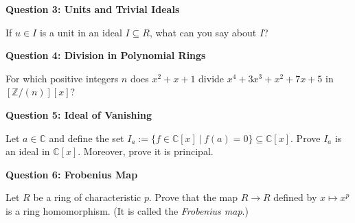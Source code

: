 \documentclass[11pt,twoside, a4paper]{report}
\theoremstyle{plain}
\theoremstyle{definition}
\begin{document}

  


  
\begin{center}
{\bf Question 3: Units and Trivial Ideals}
\end{center}

If $u\in I$ is a unit in an ideal $I\subseteq R$, what can you say about $I$?

  


\begin{center}
{\bf Question 4: Division in Polynomial Rings }
\end{center}
For which positive integers $n$ does $x^2 + x + 1$ divide $x^4 + 3x^3 +x^2 + 7x +5$ in $[\mathbb{Z}/(n)][x]$?

  


  
\begin{center}
{\bf Question 5: Ideal of Vanishing}
\end{center}

Let $a \in \mathbb{C}$ and define the set $I_{a}:= \{ f \in \mathbb{C}[x] \ | \ f(a) = 0 \} \subseteq \mathbb{C}[x]$. Prove $I_{a}$ is an ideal in $\mathbb{C}[x]$. Moreover, prove it is principal. 

\begin{center}
{\bf Question 6: Frobenius Map}
\end{center}

Let $R$ be a ring of characteristic $p$. Prove that the map $R \rightarrow R$ defined by $x \mapsto x^p$ is a ring homomorphism. (It is called the \emph{Frobenius map}.)
\end{document}
